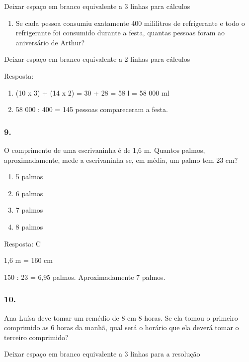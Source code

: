 Deixar espaço em branco equivalente a 3 linhas para cálculos

\begin{enumerate}
\def\labelenumi{\alph{enumi})}
\item
  Se cada pessoa consumiu exatamente 400 mililitros de refrigerante e
  todo o refrigerante foi consumido durante a festa, quantas pessoas
  foram ao aniversário de Arthur?
\end{enumerate}

Deixar espaço em branco equivalente a 2 linhas para cálculos

Resposta:

\begin{enumerate}
\def\labelenumi{\alph{enumi})}
\item
  (10 x 3) + (14 x 2) = 30 + 28 = 58 l = 58 000 ml
\item
  58 000 : 400 = 145 pessoas compareceram a festa.
\end{enumerate}

\subsubsection{9.}\label{section-47}

O comprimento de uma escrivaninha é de 1,6 m. Quantos palmos,
aproximadamente, mede a escrivaninha se, em média, um palmo tem 23 cm?

\begin{enumerate}
\def\labelenumi{\alph{enumi})}
\item
  5 palmos
\item
  6 palmos
\item
  7 palmos
\item
  8 palmos
\end{enumerate}

Resposta: C

1,6 m = 160 cm

150 : 23 = 6,95 palmos. Aproximadamente 7 palmos.

\subsubsection{10.}\label{section-48}

Ana Luísa deve tomar um remédio de 8 em 8 horas. Se ela tomou o primeiro
comprimido as 6 horas da manhã, qual será o horário que ela deverá tomar
o terceiro comprimido?

Deixar espaço em branco equivalente a 3 linhas para a resolução

